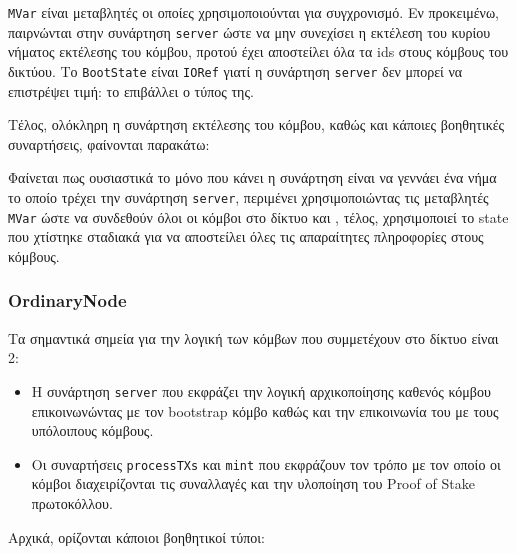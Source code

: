 \documentclass{article}
\newcommand{\eng}[1]{\foreignlanguage{english}{#1}} %
\begin{document}
    

\texttt{\eng{MVar}} είναι μεταβλητές οι οποίες χρησιμοποιούνται για συγχρονισμό. Εν προκειμένω,
παιρνώνται στην συνάρτηση \texttt{\eng{server}} ώστε να μην συνεχίσει η εκτέλεση του κυρίου
νήματος εκτέλεσης του κόμβου, προτού έχει αποστείλει όλα τα \eng{ids} στους κόμβους του δικτύου.
Το \texttt{\eng{BootState}} είναι \texttt{\eng{IORef}} γιατί η συνάρτηση \texttt{\eng{server}}
δεν μπορεί να επιστρέψει τιμή: το επιβάλλει ο τύπος της.

Τέλος, ολόκληρη η συνάρτηση εκτέλεσης του κόμβου, καθώς και κάποιες βοηθητικές συναρτήσεις,
φαίνονται παρακάτω:

    

Φαίνεται πως ουσιαστικά το μόνο που κάνει η συνάρτηση είναι να γεννάει ένα νήμα
το οποίο τρέχει την συνάρτηση \texttt{\eng{server}}, περιμένει χρησιμοποιώντας
τις μεταβλητές \texttt{\eng{MVar}} ώστε να συνδεθούν όλοι οι κόμβοι στο δίκτυο και
, τέλος, χρησιμοποιεί το \eng{state} που χτίστηκε σταδιακά για να αποστείλει όλες
τις απαραίτητες πληροφορίες στους κόμβους.

\subsubsection{\eng{OrdinaryNode}}

Τα σημαντικά σημεία για την λογική των κόμβων που συμμετέχουν στο δίκτυο είναι 2:

\begin{itemize}
    \item Η συνάρτηση \texttt{\eng{server}} που εκφράζει την λογική αρχικοποίησης
        καθενός κόμβου επικοινωνώντας με τον \eng{bootstrap} κόμβο καθώς και την
        επικοινωνία του με τους υπόλοιπους κόμβους.
    \item Οι συναρτήσεις \texttt{\eng{processTXs}} και \texttt{\eng{mint}} που
        εκφράζουν τον τρόπο με τον οποίο οι κόμβοι διαχειρίζονται τις συναλλαγές
        και την υλοποίηση του \eng{Proof of Stake} πρωτοκόλλου.
\end{itemize}

Αρχικά, ορίζονται κάποιοι βοηθητικοί τύποι:
\end{document}
